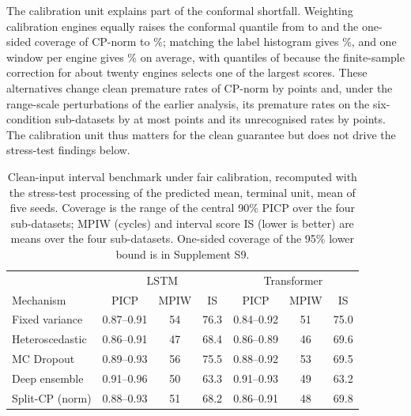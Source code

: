 The calibration unit explains part of the conformal shortfall. Weighting calibration engines equally raises the conformal quantile from \RVQAll{} to \RVQEW{} and the one-sided coverage of CP-norm to \RVCovOneEW\%; matching the label histogram gives \RVCovOneLM\%, and one window per engine gives \RVCovOneOPE\% on average, with quantiles of \RVQOPE{} because the finite-sample correction for about twenty engines selects one of the largest scores. These alternatives change clean premature rates of CP-norm by \RVCalCleanPremShift{} points and, under the range-scale perturbations of the earlier analysis, its premature rates on the six-condition sub-datasets by at most \RVCalDriftShiftSix{} points and its unrecognised rates by \RVCalLateShift{} points. The calibration unit thus matters for the clean guarantee but does not drive the stress-test findings below.

\begin{table}[!t]
\caption{Clean-input interval benchmark under fair calibration, recomputed with the stress-test processing of the predicted mean, terminal unit, mean of five seeds. Coverage is the range of the central 90\% PICP over the four sub-datasets; MPIW (cycles) and interval score IS (lower is better) are means over the four sub-datasets. One-sided coverage of the 95\% lower bound is in Supplement S9.}
\label{tab:clean}
\centering\small
\begin{tabular}{lccc|ccc}
\toprule
 & \multicolumn{3}{c|}{LSTM} & \multicolumn{3}{c}{Transformer} \\
Mechanism & PICP & MPIW & IS & PICP & MPIW & IS \\
\midrule
Fixed variance & 0.87--0.91 & 54 & 76.3 & 0.84--0.92 & 51 & 75.0 \\
Heteroscedastic & 0.86--0.91 & 47 & 68.4 & 0.86--0.89 & 46 & 69.6 \\
MC Dropout & 0.89--0.93 & 56 & 75.5 & 0.88--0.92 & 53 & 69.5 \\
Deep ensemble & 0.91--0.96 & 50 & 63.3 & 0.91--0.93 & 49 & 63.2 \\
Split-CP (norm) & 0.88--0.93 & 51 & 68.2 & 0.86--0.91 & 48 & 69.8 \\
\bottomrule
\end{tabular}
\end{table}

